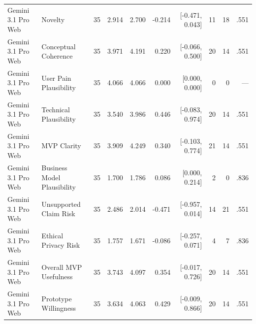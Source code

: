 \documentclass[10pt]{article}
\begin{document}
\begin{landscape}
\begin{longtable}{llrrrrrrrr}
Gemini 3.1 Pro Web & Novelty & 35 & 2.914 & 2.700 & -0.214 & [-0.471, 0.043] & 11 & 18 & .551 \\
Gemini 3.1 Pro Web & Conceptual Coherence & 35 & 3.971 & 4.191 & 0.220 & [-0.066, 0.500] & 20 & 14 & .551 \\
Gemini 3.1 Pro Web & User Pain Plausibility & 35 & 4.066 & 4.066 & 0.000 & [0.000, 0.000] & 0 & 0 & — \\
Gemini 3.1 Pro Web & Technical Plausibility & 35 & 3.540 & 3.986 & 0.446 & [-0.083, 0.974] & 20 & 14 & .551 \\
Gemini 3.1 Pro Web & MVP Clarity & 35 & 3.909 & 4.249 & 0.340 & [-0.103, 0.774] & 21 & 14 & .551 \\
Gemini 3.1 Pro Web & Business Model Plausibility & 35 & 1.700 & 1.786 & 0.086 & [0.000, 0.214] & 2 & 0 & .836 \\
Gemini 3.1 Pro Web & Unsupported Claim Risk & 35 & 2.486 & 2.014 & -0.471 & [-0.957, 0.014] & 14 & 21 & .551 \\
Gemini 3.1 Pro Web & Ethical Privacy Risk & 35 & 1.757 & 1.671 & -0.086 & [-0.257, 0.071] & 4 & 7 & .836 \\
Gemini 3.1 Pro Web & Overall MVP Usefulness & 35 & 3.743 & 4.097 & 0.354 & [-0.017, 0.726] & 20 & 14 & .551 \\
Gemini 3.1 Pro Web & Prototype Willingness & 35 & 3.634 & 4.063 & 0.429 & [-0.009, 0.866] & 20 & 14 & .551 \\
\end{longtable}
\end{landscape}
\small
\end{document}

